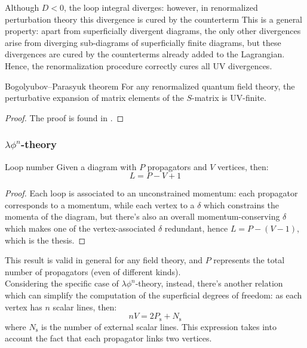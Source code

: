 Although $ D < 0 $, the loop integral diverges: however, in renormalized perturbation theory this divergence is cured by the counterterm  This is a general property: apart from superficially divergent diagrams, the only other divergences arise from diverging sub-diagrams of superficially finite diagrams, but these divergences are cured by the counterterms already added to the Lagrangian. Hence, the renormalization procedure correctly cures all UV divergences.

\begin{theorem}{Bogolyubov--Parasyuk theorem}{}
  For any renormalized quantum field theory, the perturbative expansion of matrix elements of the $ S $-matrix is UV-finite.
\end{theorem}

\begin{proofbox}
  \begin{proof}
    The proof is found in \cite{bog-par, azp}.
  \end{proof}
\end{proofbox}

\subsubsection{\texorpdfstring{$ \lambda \phi^n $}{λφn}-theory}

\begin{lemma}{Loop number}{}
  Given a diagram with $ P $ propagators and $ V $ vertices, then:
  \begin{equation}
    L = P - V + 1
    \label{eq:loop-num}
  \end{equation}
\end{lemma}

\begin{proofbox}
  \begin{proof}
    Each loop is associated to an unconstrained momentum: each propagator corresponds to a momentum, while each vertex to a $ \delta $ which constrains the momenta of the diagram, but there's also an overall momentum-conserving $ \delta $ which makes one of the vertex-associated $ \delta $ redundant, hence $ L = P - (V - 1) $, which is the thesis.
  \end{proof}
\end{proofbox}

This result is valid in general for any field theory, and $ P $ represents the total number of propagators (even of different kinds). \\
Considering the specific case of $ \lambda \phi^n $-theory, instead, there's another relation which can simplify the computation of the superficial degrees of freedom: as each vertex has $ n $ scalar lines, then:
\begin{equation}
  n V = 2 P_\text{s} + N_\text{s}
  \label{eq:fn-v}
\end{equation}
where $ N_\text{s} $ is the number of external scalar lines. This expression takes into account the fact that each propagator links two vertices.

